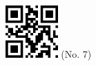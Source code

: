 \documentclass[twocolumn]{article}
\title{}
\date{}
\begin{document}

\begin{center}
 \hspace{0.2cm}
 \includegraphics[width=2cm]{qrcode-7.png}
 \hspace{0.5cm}
 \Large{  (No. 7) }
\end{center}


\end{document}
